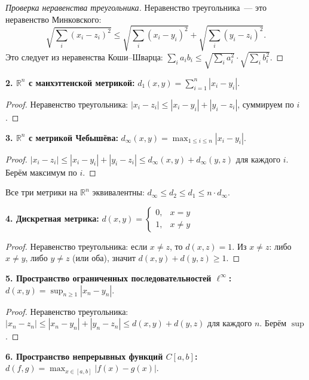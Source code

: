 \documentclass[12pt]{article}
\begin{document}
	\begin{proof}[Проверка неравенства треугольника]
		Неравенство треугольника~--- это неравенство Минковского:
		\[\sqrt{\sum_i (x_i - z_i)^2} \leqslant \sqrt{\sum_i (x_i - y_i)^2} + \sqrt{\sum_i (y_i - z_i)^2}.\]
		Это следует из неравенства Коши--Шварца: $\sum_i a_i b_i \leqslant \sqrt{\sum_i a_i^2} \cdot \sqrt{\sum_i b_i^2}$.
	\end{proof}
	
	\textbf{2. $\mathbb{R}^n$ с манхэттенской метрикой:} $d_1(x, y) = \sum_{i=1}^{n} |x_i - y_i|$.
	
	\begin{proof}
		Неравенство треугольника: $|x_i - z_i| \leqslant |x_i - y_i| + |y_i - z_i|$, суммируем по $i$.
	\end{proof}
	
	\textbf{3. $\mathbb{R}^n$ с метрикой Чебышёва:} $d_\infty(x, y) = \max_{1 \leqslant i \leqslant n} |x_i - y_i|$.
	
	\begin{proof}
		$|x_i - z_i| \leqslant |x_i - y_i| + |y_i - z_i| \leqslant d_\infty(x, y) + d_\infty(y, z)$ для каждого $i$. Берём максимум по $i$.
	\end{proof}
	
	\begin{note}
		Все три метрики на $\mathbb{R}^n$ эквивалентны: $d_\infty \leqslant d_2 \leqslant d_1 \leqslant n \cdot d_\infty$.
	\end{note}
	
	\textbf{4. Дискретная метрика:} $d(x, y) = \begin{cases} 0, & x = y \\ 1, & x \neq y \end{cases}$
	
	\begin{proof}
		Неравенство треугольника: если $x \neq z$, то $d(x,z) = 1$. Из $x \neq z$: либо $x \neq y$, либо $y \neq z$ (или оба), значит $d(x,y) + d(y,z) \geqslant 1$.
	\end{proof}
	
	\textbf{5. Пространство ограниченных последовательностей $\ell^\infty$:} $d(x, y) = \sup_{n \geqslant 1} |x_n - y_n|$.
	
	\begin{proof}
		Неравенство треугольника: $|x_n - z_n| \leqslant |x_n - y_n| + |y_n - z_n| \leqslant d(x,y) + d(y,z)$ для каждого $n$. Берём $\sup$.
	\end{proof}
	
	\textbf{6. Пространство непрерывных функций $C[a,b]$:} $d(f, g) = \max_{x \in [a,b]} |f(x) - g(x)|$.
	
\end{document}
